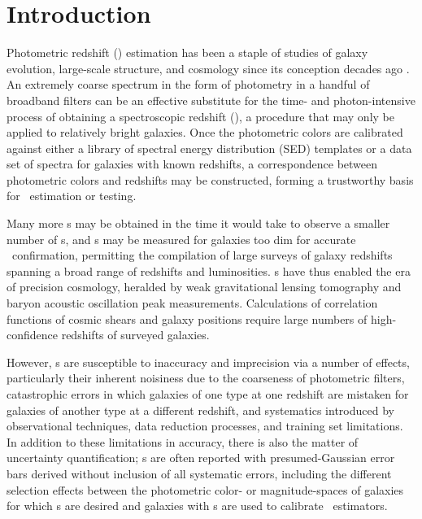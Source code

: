\chapter*{Introduction}


Photometric redshift (\pz) estimation has been a staple of studies of galaxy evolution, large-scale structure, and cosmology since its conception decades ago \citep{Baum1962}.  
An extremely coarse spectrum in the form of photometry in a handful of broadband filters can be an effective substitute for the time- and photon-intensive process of obtaining a spectroscopic redshift (\sz), a procedure that may only be applied to relatively bright galaxies.  
Once the photometric colors are calibrated against either a library of spectral energy distribution (SED) templates or a data set of spectra for galaxies with known redshifts, a correspondence between photometric colors and redshifts may be constructed, forming a trustworthy basis for \pz\ estimation or testing.

Many more \pz s may be obtained in the time it would take to observe a smaller number of \sz s, and \pz s may be measured for galaxies too dim for accurate \sz\ confirmation, permitting the compilation of large surveys of galaxy redshifts spanning a broad range of redshifts and luminosities.  
\Pz s have thus enabled the era of precision cosmology, heralded by weak gravitational lensing tomography and baryon acoustic oscillation peak measurements.  
Calculations of correlation functions of cosmic shears and galaxy positions require large numbers of high-confidence redshifts of surveyed galaxies.  

However, \pz s are susceptible to inaccuracy and imprecision via a number of effects, particularly their inherent noisiness due to the coarseness of photometric filters, catastrophic errors in which galaxies of one type at one redshift are mistaken for galaxies of another type at a different redshift, and systematics introduced by observational techniques, data reduction processes, and training set limitations.  
In addition to these limitations in accuracy, there is also the matter of uncertainty quantification; \pz s are often reported with presumed-Gaussian error bars derived without inclusion of all systematic errors, including the different selection effects between the photometric color- or magnitude-spaces of galaxies for which \pz s are desired and galaxies with \sz s are used to calibrate \pz\ estimators.

